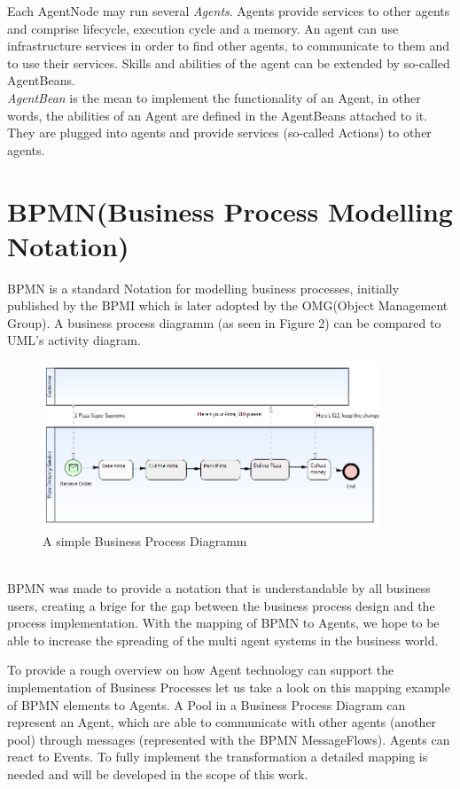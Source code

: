 Each AgentNode may run several \textit{Agents}. Agents provide services to other agents
and comprise lifecycle, execution cycle and a memory. An agent can use infrastructure
services in order to find other agents, to communicate to them and to use their services.
Skills and abilities of the agent can be extended by so-called AgentBeans.\\
\textit{AgentBean} is the mean to implement the functionality of an Agent, in other words, the abilities of an Agent are defined in the AgentBeans attached to it. They are plugged into agents and provide services (so-called Actions) to other agents. 

\section{BPMN(Business Process Modelling Notation)}
BPMN \cite{BPMN2} is a standard Notation for modelling business processes, initially published by the BPMI which is later adopted by the OMG(Object Management Group). A business process diagramm (as seen in Figure 2) can be compared to UML's activity diagram.
\begin{figure}[h]
	\centering
		\includegraphics[width=0.90\textwidth]{images/bpmn_sampl.png}
	\caption{A simple Business Process Diagramm}
	\label{fig:bpmn_sampl}
\end{figure}\\
BPMN was made to provide a notation that is understandable by all business users, creating a brige for the gap between the business process design and the process implementation. With the mapping of BPMN to Agents, we hope to be able to increase the spreading of the multi agent systems in the business world.

To provide a rough overview on how Agent technology can support the implementation of Business Processes let us take a look on this mapping example of BPMN elements to Agents. A Pool in a Business Process Diagram can represent an Agent, which are able to communicate with other agents (another pool) through messages (represented with the BPMN MessageFlows). Agents can react to Events. To fully implement the transformation a detailed mapping is needed and will be developed in the scope of this work. 

